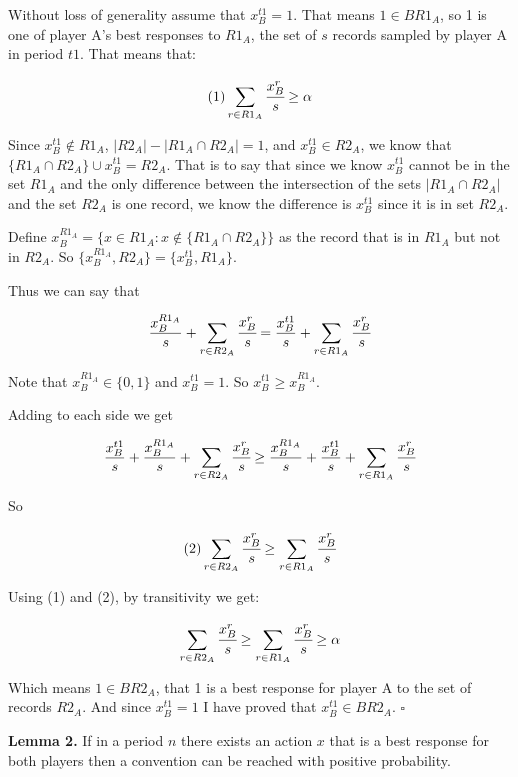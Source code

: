 \documentclass{article}
\begin{document}
\vskip12pt

Without loss of generality assume that $x_B^{t1}=1$. That means $1 \in BR1_A$, so 1 is one of player A's best responses to $R1_A$, the set of $s$ records sampled by player A in period $t1$. That means that:

$$ (1) \sum\limits_{r \in R1_A} \cfrac{x_B^r}{s} \geq \alpha$$

Since $x_B^{t1} \not \in R1_A$, $|R2_A|-|R1_A \cap R2_A|=1$, and $x_B^{t1} \in R2_A$, we know that $\{R1_A \cap R2_A\} \cup x_B^{t1} = R2_A$. That is to say that since we know $x_B^{t1}$ cannot be in the set $R1_A$ and the only difference between the intersection of the sets $|R1_A \cap R2_A|$ and the set $R2_A$ is one record, we know the difference is $x_B^{t1}$ since it is in set $R2_A$.

Define $x_B^{R1_A}=\{x \in R1_A : x \not \in \{R1_A \cap R2_A\}\}$ as the record that is in $R1_A$ but not in $R2_A$. So $\{x_B^{R1_A},R2_A\} = \{x_B^{t1},R1_A\}$.

Thus we can say that

$$\frac{x_B^{R1_A}}{s} + \sum\limits_{r \in R2_A} \cfrac{x_B^r}{s} = \frac{x_B^{t1}}{s} + \sum\limits_{r \in R1_A} \cfrac{x_B^r}{s}$$

Note that $x_B^{R1_A} \in \{0,1\}$ and $x_B^{t1}=1$. So $x_B^{t1} \geq x_B^{R1_A}$.

Adding to each side we get

$$\frac{x_B^{t1}}{s} + \frac{x_B^{R1_A}}{s} + \sum\limits_{r \in R2_A} \cfrac{x_B^r}{s} \geq \frac{x_B^{R1_A}}{s} + \frac{x_B^{t1}}{s} + \sum\limits_{r \in R1_A} \cfrac{x_B^r}{s}$$

So

$$(2) \sum\limits_{r \in R2_A} \cfrac{x_B^r}{s} \geq \sum\limits_{r \in R1_A} \cfrac{x_B^r}{s}$$

Using (1) and (2), by transitivity we get:

$$\sum\limits_{r \in R2_A} \cfrac{x_B^r}{s} \geq \sum\limits_{r \in R1_A} \cfrac{x_B^r}{s} \geq \alpha$$

Which means $1 \in BR2_A$, that 1 is a best response for player A to the set of records $R2_A$. And since $x_B^{t1}=1$ I have proved that $x_B^{t1} \in BR2_A$. $\square$

\vskip12pt

\textbf{Lemma 2.} If in a period $n$ there exists an action $x$ that is a best response for both players then a convention can be reached with positive probability.

\vskip12pt
\end{document}
